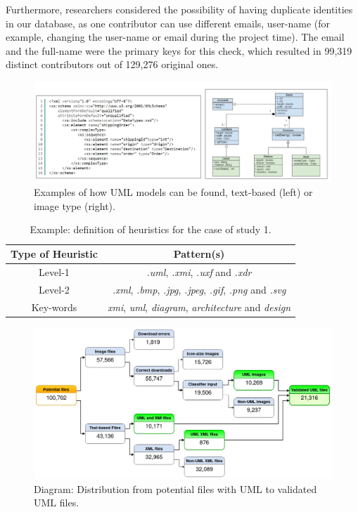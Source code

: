 \documentclass[a4paper, 12pt]{book}
\begin{document}
Furthermore, researchers considered the possibility of having duplicate identities in our database, as one contributor can
use different emails, user-name (for example, changing the user-name or email during the project time).
The email and the full-name were the primary keys for this check, which resulted in 99,319 distinct contributors out of
129,276 original ones.

 \begin{figure}
   \centering
   \includegraphics[width=15cm, keepaspectratio]{img/umls-landscape}
   \caption{Examples of how UML models can be found, text-based (left) or image type (right).}
   \label{fig:uml-types}
 \end{figure}
 \begin{table}[]
 \centering
 \caption{Example: definition of heuristics for the case of study 1.}
 \label{table:heuristics-cs1-example}
 \begin{tabular}{|c|c|}
 \hline
 \textbf{Type of Heuristic} & \textbf{Pattern(s)}                                                                                           \\ \hline
 Level-1                    & \textit{.uml}, \textit{.xmi}, \textit{.uxf} and \textit{.xdr}                                                 \\ \hline
 Level-2                    & \textit{.xml}, \textit{.bmp}, \textit{.jpg}, \textit{.jpeg}, \textit{.gif}, \textit{.png} and \textit{.svg}   \\ \hline
 Key-words                  & \textit{xmi}, \textit{uml}, \textit{diagram}, \textit{architecture} and \textit{design}                       \\ \hline
 \end{tabular}
 \end{table}
 \begin{figure}
   \centering
   \includegraphics[width=16cm, keepaspectratio]{img/file-results-models-diagram}
   \caption{Diagram: Distribution from potential files with UML to validated UML files.}
   \label{fig:validated-files-distribution}
 \end{figure}
\end{document}

